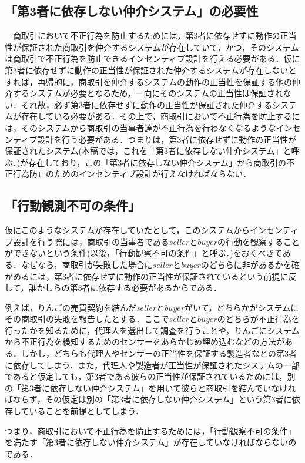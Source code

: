 \documentclass[twocolumn, a4j]{article}
\begin{document}
\subsection{「第3者に依存しない仲介システム」の必要性}
  　商取引において不正行為を防止するためには，第3者に依存せずに動作の正当性が保証された商取引を仲介するシステムが存在していて，かつ，そのシステムは商取引で不正行為を防止できるインセンティブ設計を行える必要がある．仮に第3者に依存せずに動作の正当性が保証された仲介するシステムが存在しないとすれば，再帰的に，商取引を仲介するシステムの動作の正当性を保証する他の仲介するシステムが必要となるため，一向にそのシステムの正当性は保証されない．それ故，必ず第3者に依存せずに動作の正当性が保証された仲介するシステムが存在している必要がある．その上で，商取引において不正行為を防止するには，そのシステムから商取引の当事者達が不正行為を行わなくなるようなインセンティブ設計を行う必要がある．つまりは，第3者に依存せずに動作の正当性が保証されたシステム(本稿では，これを「第3者に依存しない仲介システム」と呼ぶ．)が存在しており，この「第3者に依存しない仲介システム」から商取引の不正行為防止のためのインセンティブ設計が行えなければならない．

\subsection{「行動観測不可の条件」}
仮にこのようなシステムが存在していたとして，このシステムからインセンティブ設計を行う際には，商取引の当事者である$seller$と$buyer$の行動を観察することができないという条件(以後，「行動観察不可の条件」と呼ぶ．)をおくべきである．なぜなら，商取引が失敗した場合に$seller$と$buyer$のどちらに非があるかを確かめるには，第3者に依存せずに動作の正当性が保証されているという前提に反して，誰かしらの第3者に依存する必要があるからである．

例えば，りんごの売買契約を結んだ$seller$と$buyer$がいて，どちらかがシステムにその商取引の失敗を報告したとする．ここで$seller$と$buyer$のどちらが不正行為を行ったかを知るために，代理人を選出して調査を行うことや，りんごにシステムから不正行為を検知するためのセンサーをあらかじめ埋め込むなどの方法がある．しかし，どちらも代理人やセンサーの正当性を保証する製造者などの第3者に依存してしまう．また，代理人や製造者が正当性が保証されたシステムの一部であると仮定しても，第3者である彼らの正当性が保証されているためには，別の「第3者に依存しない仲介システム」を用いて彼らと商取引を結んでいなければならず，その仮定は別の「第3者に依存しない仲介システム」という第3者に依存していることを前提としてしまう．

つまり，商取引において不正行為を防止するためには，「行動観察不可の条件」を満たす「第3者に依存しない仲介システム」が存在していなければならないのである．
\end{document}
